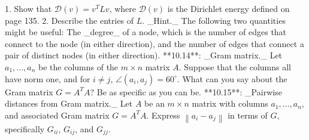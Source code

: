 1. Show that \(\mathcal{D}(v)=v^{T}Lv\), where \(\mathcal{D}(v)\) is the Dirichlet energy defined on page 135.
2. Describe the entries of \(L\). _Hint._ The following two quantities might be useful: The _degree_ of a node, which is the number of edges that connect to the node (in either direction), and the number of edges that connect a pair of distinct nodes (in either direction).
**10.14**: _Gram matrix._ Let \(a_{1},\ldots,a_{n}\) be the columns of the \(m\times n\) matrix \(A\). Suppose that the columns all have norm one, and for \(i\neq j\), \(\angle(a_{i},a_{j})=60^{\circ}\). What can you say about the Gram matrix \(G=A^{T}A\)? Be as specific as you can be.
**10.15**: _Pairwise distances from Gram matrix._ Let \(A\) be an \(m\times n\) matrix with columns \(a_{1},\ldots,a_{n}\), and associated Gram matrix \(G=A^{T}A\). Express \(\left\|a_{i}-a_{j}\right\|\) in terms of \(G\), specifically \(G_{ii}\), \(G_{ij}\), and \(G_{jj}\).

